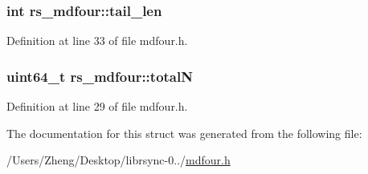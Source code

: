 \subsubsection[{tail\+\_\+len}]{\setlength{\rightskip}{0pt plus 5cm}int rs\+\_\+mdfour\+::tail\+\_\+len}\label{structrs__mdfour_a8c0d1c9166566478913b96aa9b6831da}


Definition at line 33 of file mdfour.\+h.

\hypertarget{structrs__mdfour_a9920c8f53c56ac1feacd4a40c18d939e}{}
\subsubsection[{total\+N}]{\setlength{\rightskip}{0pt plus 5cm}uint64\+\_\+t rs\+\_\+mdfour\+::total\+N}\label{structrs__mdfour_a9920c8f53c56ac1feacd4a40c18d939e}


Definition at line 29 of file mdfour.\+h.



The documentation for this struct was generated from the following file\+:\begin{DoxyCompactItemize}
\item 
/\+Users/\+Zheng/\+Desktop/librsync-\/0../\hyperlink{mdfour_8h}{mdfour.\+h}\end{DoxyCompactItemize}
